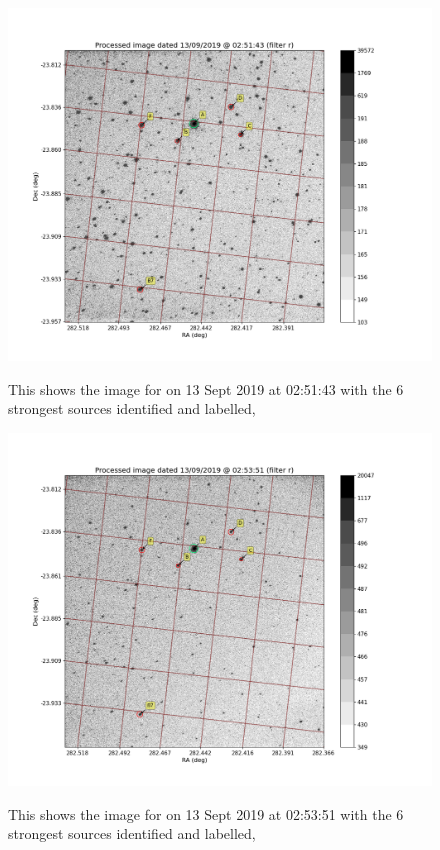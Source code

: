 \begin{figure}[!htbp]
\begin{center}
\includegraphics[scale=0.40]{images/fig005.png} \\
\end{center}
\caption{This shows the image for {\ross} on 13
Sept 2019 at 02:51:43 with the 6 strongest sources
identified and labelled,}\protect\label{fig:fig5}
\end{figure}

\begin{figure}[!htbp]
\begin{center}
\includegraphics[scale=0.40]{images/fig006.png} \\
\end{center}
\caption{This shows the image for {\ross} on 13
Sept 2019 at 02:53:51 with the 6 strongest sources
identified and labelled,}\protect\label{fig:fig6}
\end{figure}


